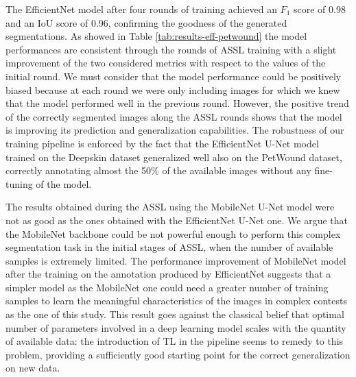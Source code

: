 \documentclass[../main.tex]{subfiles}
\begin{document}
The EfficientNet model after four rounds of training achieved an $F_1$ score of 0.98 and an IoU score of 0.96, confirming the goodness of the generated segmentations.
As showed in Table \ref{tab:results-eff-petwound} the model performances are consistent through the rounds of ASSL training with a slight improvement of the two considered metrics with respect to the values of the initial round. 
We must consider that the model performance could be positively biased because at each round we were only including images for which we knew that the model performed well in the previous round.
However, the positive trend of the correctly segmented images along the ASSL rounds shows that the model is improving its prediction and generalization capabilities. 
The robustness of our training pipeline is enforced by the fact that the EfficientNet U-Net model trained on the Deepskin dataset generalized well also on the PetWound dataset, correctly annotating almost the 50\% of the available images without any fine-tuning of the model.

The results obtained during the ASSL using the MobileNet U-Net model were not as good as the ones obtained with the EfficientNet U-Net one.
We argue that the MobileNet backbone could be not powerful enough to perform this complex segmentation task in the initial stages of ASSL, when the number of available samples is extremely limited. 
The performance improvement of MobileNet model after the training on the annotation produced by EfficientNet suggests that a simpler model as the MobileNet one could need a greater number of training samples to learn the meaningful characteristics of the images in complex contests as the one of this study.
This result goes against the classical belief that optimal number of parameters involved in a deep learning model scales with the quantity of available data: the introduction of TL in the pipeline seems to remedy to this problem, providing a sufficiently good starting point for the correct generalization on new data.
\end{document}

